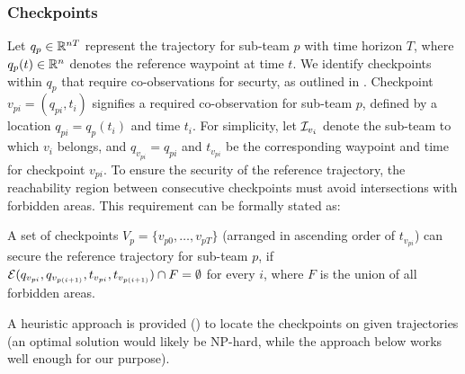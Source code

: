 \documentclass[10pt,twocolumn,twoside]{IEEEtran}
\begin{document}
\subsubsection{Checkpoints}\label{sec:security-checkpoint}
Let $q_p\in\mathbb{R}^{nT}{}$ represent the trajectory for sub-team $p$ with time horizon $T$, where $q_{p}(t) \in \mathbb{R}^{n}{}$ denotes the reference waypoint at time $t$. We identify checkpoints within $q_p$ that require co-observations for securty, as outlined in . Checkpoint $v_{pi}=(q_{pi},t_{i})$ signifies a required co-observation for sub-team $p$, defined by a location $q_{pi}=q_{p}(t_i)$ and time $t_{i}$. For simplicity, let $\mathcal{I}_{v_{i}}$ denote the sub-team to which $v_{i}$ belongs, and $q_{v_{pi}} =q_{pi}$ and $t_{v_{pi}}$ be the corresponding waypoint and time for checkpoint $v_{pi}$. To ensure the security of the reference trajectory, the reachability region between consecutive checkpoints must avoid intersections with forbidden areas. This requirement can be formally stated as:


\begin{remark}
A set of checkpoints $V_{p}=\{ v_{p0}, \dots ,v_{pT}\}$ (arranged in ascending order of $t_{v_{pi}}$) can secure the reference trajectory for sub-team $p$, if $\mathcal{E}(q_{v_{pi}}, q_{v_{p(i+1)}}, t_{v_{pi}},t_{v_{p(i+1)}}) \cap F = \emptyset$ for every $i$, where $F$ is the union of all forbidden areas.
\end{remark}

A heuristic approach is provided () to locate the checkpoints on given trajectories (an optimal solution would likely be NP-hard, while the approach below works well enough for our purpose). %
\end{document}
